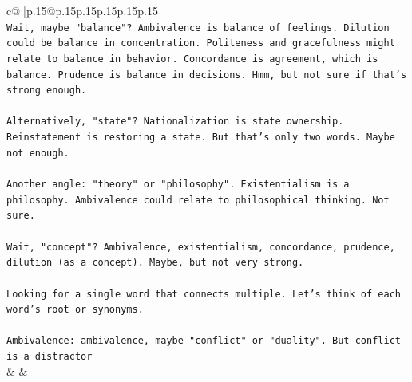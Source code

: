 \documentclass{article}
\begin{document}
{\begin{supertabular}{c@{$\;$}|p{.15\linewidth}@{}p{.15\linewidth}p{.15\linewidth}p{.15\linewidth}p{.15\linewidth}p{.15\linewidth}}
{{{\\ 
\texttt{Wait, maybe "balance"? Ambivalence is balance of feelings. Dilution could be balance in concentration. Politeness and gracefulness might relate to balance in behavior. Concordance is agreement, which is balance. Prudence is balance in decisions. Hmm, but not sure if that's strong enough.} \\
\\ 
\texttt{Alternatively, "state"? Nationalization is state ownership. Reinstatement is restoring a state. But that's only two words. Maybe not enough.} \\
\\ 
\texttt{Another angle: "theory" or "philosophy". Existentialism is a philosophy. Ambivalence could relate to philosophical thinking. Not sure.} \\
\\ 
\texttt{Wait, "concept"? Ambivalence, existentialism, concordance, prudence, dilution (as a concept). Maybe, but not very strong.} \\
\\ 
\texttt{Looking for a single word that connects multiple. Let's think of each word's root or synonyms.} \\
\\ 
\texttt{Ambivalence: ambivalence, maybe "conflict" or "duality". But conflict is a distractor} \\
            }
        }
    }
    & & \\ \\


\end{supertabular}}
\end{document}
